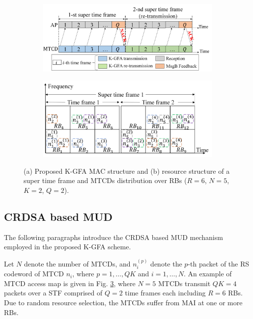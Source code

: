 \documentclass[a4paper]{IEEEtran}
\begin{document}
\begin{figure}[t]
    \centering
        \begin{subfigure}[b]{0.51\textwidth}
         \centering
         \includegraphics[width=\textwidth]{Figs/STF_structure.png}
         \caption{}
         \label{fig: STF structure}
     \end{subfigure}
    \begin{subfigure}[b]{0.49\textwidth}
         \centering
         \includegraphics[width=\textwidth]{Figs/QK_Fig3V2.png}
         \caption{}
         \label{fig: resource structure}
     \end{subfigure}
     \caption{(a) Proposed K-GFA MAC structure and (b) resource structure of a super time frame and MTCDs distribution over RBs ($R=6$, $N=5$, $K=2$, $Q=2$).}
    \label{fig1}
\end{figure}

\subsection{CRDSA based MUD}

The following paragraphs introduce the CRDSA based MUD mechanism employed in the proposed K-GFA scheme. 

Let $N$ denote the number of MTCDs, and $n^{(p)}_i$ denote the $p$-th packet of the RS codeword of MTCD $n_i$, where $p = 1, \dots, QK$ and $i = 1, \dots, N$. An example of MTCD access map is given in Fig. \ref{fig1}, where $N=5$ MTCDs transmit $QK = 4$ packets over a STF comprised of $Q = 2$ time frames each including $R = 6$ RBs. Due to random resource selection, the MTCDs suffer from MAI at one or more RBs.
\end{document}
